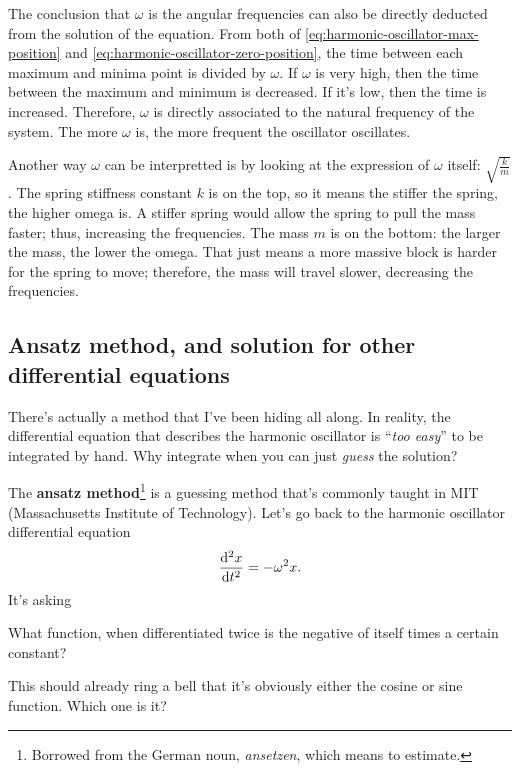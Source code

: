 The conclusion that $\omega$ is the angular frequencies can also be directly deducted from the solution of the equation. From both of \cref{eq:harmonic-oscillator-max-position} and \cref{eq:harmonic-oscillator-zero-position}, the time between each maximum and minima point is divided by $\omega$. If $\omega$ is very high, then the time between the maximum and minimum is decreased. If it's low, then the time is increased. Therefore, $\omega$ is directly associated to the natural frequency of the system. The more $\omega$ is, the more frequent the oscillator oscillates.

Another way $\omega$ can be interpretted is by looking at the expression of $\omega$ itself: $\sqrt{\frac{k}{m}}$. The spring stiffness constant $k$ is on the top, so it means the stiffer the spring, the higher omega is. A stiffer spring would allow the spring to pull the mass faster; thus, increasing the frequencies. The mass $m$ is on the bottom: the larger the mass, the lower the omega. That just means a more massive block is harder for the spring to move; therefore, the mass will travel slower, decreasing the frequencies.

\subsection{Ansatz method, and solution for other differential equations}

There's actually a method that I've been hiding all along. In reality, the differential equation that describes the harmonic oscillator is \enquote{\emph{too easy}} to be integrated by hand. Why integrate when you can just \emph{guess} the solution?

The \textbf{ansatz method}\footnote{Borrowed from the German noun, \emph{ansetzen}, which means to estimate.} is a guessing method that's commonly taught in MIT (Massachusetts Institute of Technology). Let's go back to the harmonic oscillator differential equation
\begin{equation}
	\odv[ord = 2]{x}{t} = -\omega^2 x. 
\end{equation}
It's asking
\begin{displayquote}
	What function, when differentiated twice is the negative of itself times a certain constant?
\end{displayquote}
This should already ring a bell that it's obviously either the cosine or sine function. Which one is it?

